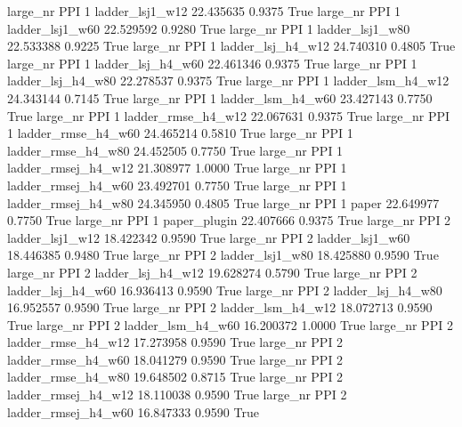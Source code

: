   large_nr      PPI                 1     ladder_lsj1_w12   22.435635      0.9375    True
  large_nr      PPI                 1     ladder_lsj1_w60   22.529592      0.9280    True
  large_nr      PPI                 1     ladder_lsj1_w80   22.533388      0.9225    True
  large_nr      PPI                 1   ladder_lsj_h4_w12   24.740310      0.4805    True
  large_nr      PPI                 1   ladder_lsj_h4_w60   22.461346      0.9375    True
  large_nr      PPI                 1   ladder_lsj_h4_w80   22.278537      0.9375    True
  large_nr      PPI                 1   ladder_lsm_h4_w12   24.343144      0.7145    True
  large_nr      PPI                 1   ladder_lsm_h4_w60   23.427143      0.7750    True
  large_nr      PPI                 1  ladder_rmse_h4_w12   22.067631      0.9375    True
  large_nr      PPI                 1  ladder_rmse_h4_w60   24.465214      0.5810    True
  large_nr      PPI                 1  ladder_rmse_h4_w80   24.452505      0.7750    True
  large_nr      PPI                 1 ladder_rmsej_h4_w12   21.308977      1.0000    True
  large_nr      PPI                 1 ladder_rmsej_h4_w60   23.492701      0.7750    True
  large_nr      PPI                 1 ladder_rmsej_h4_w80   24.345950      0.4805    True
  large_nr      PPI                 1               paper   22.649977      0.7750    True
  large_nr      PPI                 1        paper_plugin   22.407666      0.9375    True
  large_nr      PPI                 2     ladder_lsj1_w12   18.422342      0.9590    True
  large_nr      PPI                 2     ladder_lsj1_w60   18.446385      0.9480    True
  large_nr      PPI                 2     ladder_lsj1_w80   18.425880      0.9590    True
  large_nr      PPI                 2   ladder_lsj_h4_w12   19.628274      0.5790    True
  large_nr      PPI                 2   ladder_lsj_h4_w60   16.936413      0.9590    True
  large_nr      PPI                 2   ladder_lsj_h4_w80   16.952557      0.9590    True
  large_nr      PPI                 2   ladder_lsm_h4_w12   18.072713      0.9590    True
  large_nr      PPI                 2   ladder_lsm_h4_w60   16.200372      1.0000    True
  large_nr      PPI                 2  ladder_rmse_h4_w12   17.273958      0.9590    True
  large_nr      PPI                 2  ladder_rmse_h4_w60   18.041279      0.9590    True
  large_nr      PPI                 2  ladder_rmse_h4_w80   19.648502      0.8715    True
  large_nr      PPI                 2 ladder_rmsej_h4_w12   18.110038      0.9590    True
  large_nr      PPI                 2 ladder_rmsej_h4_w60   16.847333      0.9590    True
